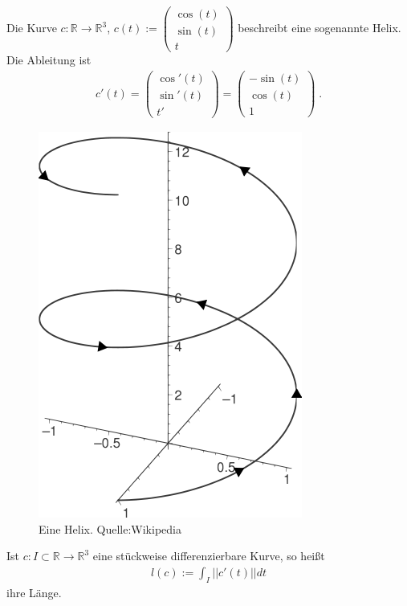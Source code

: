 \begin{Beispiel}
Die Kurve 
$c :  \mathbb{R}   \to  \mathbb{R}^3$, $c(t) :=  \begin{pmatrix} \cos(t) \\  \sin(t) \\  t \end{pmatrix}$
beschreibt eine sogenannte Helix. Die Ableitung ist
\begin{align*}
c'(t) =  \begin{pmatrix} \cos'(t) \\  \sin'(t) \\  t'  \end{pmatrix} = \begin{pmatrix} -\sin(t) \\  \cos(t) \\  1 \end{pmatrix} \;.
\end{align*} 
\end{Beispiel}
\begin{figure}[H]
    \centering
    \includegraphics[scale=0.45]{images/Helix.png}
    \caption{Eine Helix. Quelle:Wikipedia}
    \label{fig:helix}
\end{figure}

\begin{Definition}
Ist $c: I \subset \mathbb{R} \to \mathbb{R}^3$ eine stückweise differenzierbare Kurve, so heißt
\begin{align*}
l(c) := \int_{I} ||c'(t)|| dt
\end{align*}
ihre Länge.
\end{Definition}



